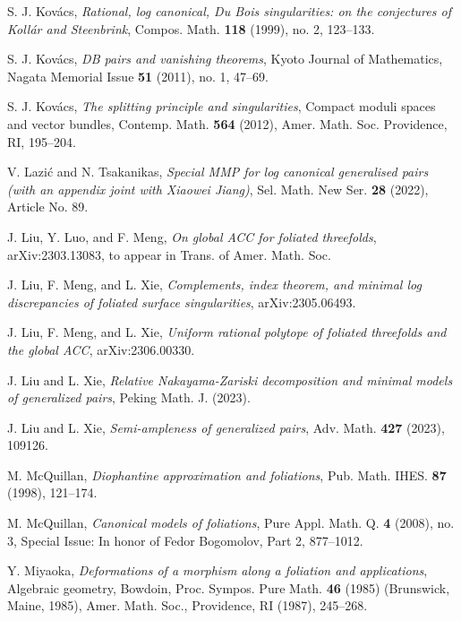 \documentclass[11pt]{amsart}
\numberwithin{equation}{section}
\theoremstyle{definition}
\theoremstyle{definition}
\theoremstyle{definition}
\begin{document}
\begin{thebibliography}{99}
 S. J. Kov\'acs, \textit{Rational, log canonical, Du Bois singularities: on the conjectures of Koll\'ar and Steenbrink}, Compos. Math. \textbf{118} (1999), no. 2, 123--133.

 S. J. Kov\'acs, \textit{DB pairs and vanishing theorems}, Kyoto Journal of Mathematics, Nagata Memorial Issue \textbf{51} (2011), no. 1, 47--69.

 S. J. Kov\'acs, \textit{The splitting principle and singularities}, Compact moduli spaces and vector bundles, Contemp. Math. \textbf{564} (2012), Amer. Math. Soc. Providence, RI, 195--204.



 V. Lazi\'c and N. Tsakanikas, \textit{Special MMP for log canonical generalised pairs (with an appendix joint with Xiaowei Jiang)}, Sel. Math. New Ser. \textbf{28} (2022), Article No. 89.

 J. Liu, Y. Luo, and F. Meng, \textit{On global ACC for foliated threefolds}, arXiv:2303.13083, to appear in Trans. of Amer. Math. Soc.

 J. Liu, F. Meng, and L. Xie, \textit{Complements, index theorem, and minimal log discrepancies of foliated surface singularities}, arXiv:2305.06493.

 J. Liu, F. Meng, and L. Xie, \textit{Uniform rational polytope of foliated threefolds and the global ACC}, arXiv:2306.00330.

 J. Liu and L. Xie, \textit{Relative Nakayama-Zariski decomposition and minimal models of generalized pairs}, Peking Math. J. (2023).

 J. Liu and L. Xie, \textit{Semi-ampleness of generalized pairs}, Adv. Math. \textbf{427} (2023), 109126.

 M. McQuillan, \textit{Diophantine approximation and foliations}, Pub. Math. IHES. \textbf{87} (1998), 121--174.

 M. McQuillan, \textit{Canonical models of foliations}, Pure Appl. Math. Q. \textbf{4} (2008), no. 3, Special Issue: In honor of Fedor Bogomolov, Part 2, 877--1012.

 Y. Miyaoka, \textit{Deformations of a morphism along a foliation and applications}, Algebraic geometry, Bowdoin, Proc. Sympos. Pure Math. \textbf{46} (1985) (Brunswick, Maine, 1985), Amer. Math. Soc., Providence, RI (1987), 245--268.



\end{thebibliography}
\end{document}

